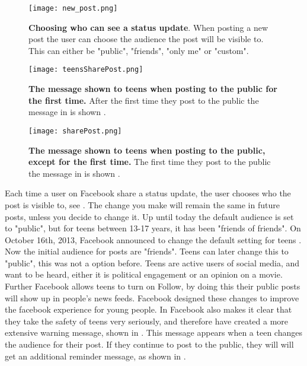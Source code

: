 \begin{figure}[t]
\centering
\texttt{[image: new\_post.png]}
\caption[Choosing who can see a status update.]{\textbf{Choosing who can see a status update}. When posting a new post the user can choose the audience the post will be visible to. This can either be "public", "friends", "only me" or "custom".} 
\label{fig:newPost}
\end{figure}

\begin{figure}[b]
\centering
\texttt{[image: teensSharePost.png]}
\caption[The message shown to teens when posting to the public for the first time]{\textbf{The message shown to teens when posting to the public for the first time.} After the first time they post to the public the message in  is shown \cite{defaultTeens}.} 
\label{fig:teensSharePost}
\end{figure}

\begin{figure}[t]
\centering
\texttt{[image: sharePost.png]}
\caption [The message shown to teens when posting to the public, except for the first time]{\textbf{The message shown to teens when posting to the public, except for the first time.} The first time they post to the public the message in  is shown \cite{defaultTeens}.} 
\label{fig:sharePost}
\end{figure}

Each time a user on Facebook share a status update, the user chooses who the post is visible to, see . The change you make will remain the same in future posts, unless you decide to change it. Up until today the default audience is set to "public", but for teens between 13-17 years, it has been "friends of friends". On October 16th, 2013, Facebook announced to change the default setting for teens \cite{defaultTeens}. Now the initial audience for posts are "friends". Teens can later change this to "public", this was not a option before. Teens are active users of social media, and want to be heard, either it is political engagement or an opinion on a movie. Further Facebook allows teens to turn on Follow, by doing this their public posts will show up in people's news feeds. Facebook designed these changes to improve the facebook experience for young people. In \cite{defaultTeens} Facebook also makes it clear that they take the safety of teens very seriously, and therefore have created a more extensive warning message, shown in  . This message appears when a teen changes the audience for their post. If they continue to post to the public, they will will get an additional reminder message, as shown in  .

